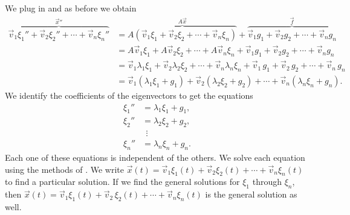 We plug in and as before we obtain
\begin{equation*}
\begin{split}
\overbrace{
\vec{v}_1 \xi_1'' + 
\vec{v}_2 \xi_2'' + \cdots +
\vec{v}_n \xi_n''
}^{{\vec{x}}''}
& =
\overbrace{
A \left( \vec{v}_1 \xi_1 + 
\vec{v}_2 \xi_2 + \cdots +
\vec{v}_n \xi_n \right)
}^{A\vec{x}}
+
\overbrace{
\vec{v}_1 g_1 + 
\vec{v}_2 g_2 + \cdots +
\vec{v}_n g_n
}^{\vec{f}}
\\
& = 
A \vec{v}_1 \xi_1 + 
A \vec{v}_2 \xi_2 + \cdots +
A \vec{v}_n \xi_n
+
\vec{v}_1 g_1 + 
\vec{v}_2 g_2 + \cdots +
\vec{v}_n g_n
\\
& =
\vec{v}_1 \lambda_1 \xi_1 + 
\vec{v}_2 \lambda_2 \xi_2 + \cdots +
\vec{v}_n \lambda_n \xi_n
+
\vec{v}_1 \, g_1 + 
\vec{v}_2 \, g_2 + \cdots +
\vec{v}_n \, g_n
\\
& =
\vec{v}_1 ( \lambda_1 \xi_1 + g_1 ) +
\vec{v}_2 ( \lambda_2 \xi_2 + g_2 ) + \cdots + 
\vec{v}_n ( \lambda_n \xi_n + g_n ) .
\end{split}
\end{equation*}
We identify the coefficients of the eigenvectors to get the equations
\begin{align*}
\xi_1'' & = \lambda_1 \xi_1 + g_1 , \\
\xi_2'' & = \lambda_2 \xi_2 + g_2 , \\
& ~~ \vdots \\
\xi_n'' & = \lambda_n \xi_n + g_n .
\end{align*}
Each one of these equations is independent of the others.
We solve each equation using the methods of .
We write
$\vec{x}(t) =
\vec{v}_1 \xi_1(t) +
\vec{v}_2 \xi_2(t) + \cdots +
\vec{v}_n \xi_n(t)$ to find a particular solution.
If we find the general solutions for $\xi_1$ through $\xi_n$, then
$\vec{x}(t) =
\vec{v}_1 \xi_1(t) + \vec{v}_2 \, \xi_2(t) + \cdots +
\vec{v}_n \xi_n(t)$ is the general solution as well.

